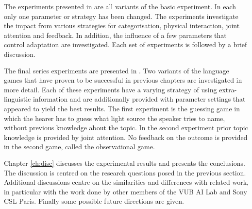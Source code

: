 The experiments presented in  are all variants of the basic experiment. In each only one parameter or strategy has been changed. The experiments investigate the impact from various strategies for categorisation, physical interaction, joint attention and feedback. In addition, the influence of a few parameters that control adaptation are investigated. Each set of experiments is followed by a brief discussion.

The final series experiments are presented in . Two variants of the language games that have proven to be successful in previous chapters are investigated in more detail. Each of these experiments have a varying strategy of using extra-linguistic information and are additionally provided with parameter settings that appeared to yield the best results. The first experiment is the {\sc guessing game} in which the hearer has to guess what light source the speaker tries to name, without previous knowledge about the topic. In the second experiment prior topic knowledge is provided by joint attention. No feedback on the outcome is provided in the second game, called the {\sc observational game}.


Chapter \ref{ch:disc} discusses the experimental results and presents the conclusions. The discussion is centred on the research questions posed in the previous section. Additional discussions centre on the similarities and differences with related work, in particular with the work done by other members of the VUB AI Lab and Sony CSL Paris. Finally some possible future directions are given.




